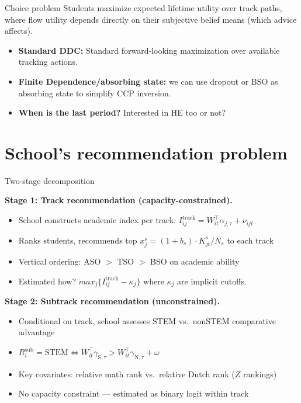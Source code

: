 \documentclass[10pt,aspectratio=169]{beamer}
\begin{document}
\begin{frame}{Choice problem}
    Students maximize expected lifetime utility over track paths, where flow utility depends directly on their subjective belief means (which advice affects). 
    
    \begin{itemize}
        \item \textbf{Standard DDC:} Standard forward-looking maximization over available tracking actions.
        \item \textbf{Finite Dependence/absorbing state:} we can use dropout or BSO as absorbing state to simplify CCP inversion.  
        \item \textbf{When is the last period?} Interested in HE too or not?
    \end{itemize}
\end{frame}

\section{School's recommendation problem}

\begin{frame}{Two-stage decomposition}
\small

\bigskip

\textbf{Stage 1: Track recommendation (capacity-constrained).}
\begin{itemize}\setlength\itemsep{2pt}
  \item School constructs academic index per track: $I_{ij}^{\mathrm{track}} = W_{it}^\top \alpha_{j,\tau} + \nu_{ijt}$
  \item Ranks students, recommends top $x_j^s = (1+b_s) \cdot K_{jt}^s / N_s$ to each track
  \item Vertical ordering: ASO $>$ TSO $>$ BSO on academic ability
  \item Estimated how? \(max_{j}\{I_{ij}^{\mathrm{track}} - \kappa_{j}\}\) where $\kappa_{j}$ are implicit cutoffs.
\end{itemize}

\bigskip

\textbf{Stage 2: Subtrack recommendation (unconstrained).}
\begin{itemize}\setlength\itemsep{2pt}
  \item Conditional on track, school assesses STEM vs.\ nonSTEM comparative advantage
  \item $R_i^{\mathrm{sub}} = \text{STEM} \iff W_{it}^\top \gamma_{\text{S},\tau} > W_{it}^\top \gamma_{\text{N},\tau} + \omega$
  \item Key covariates: relative math rank vs.\ relative Dutch rank ($Z$ rankings)
  \item No capacity constraint --- estimated as binary logit within track
\end{itemize}
\end{frame}
\end{document}
